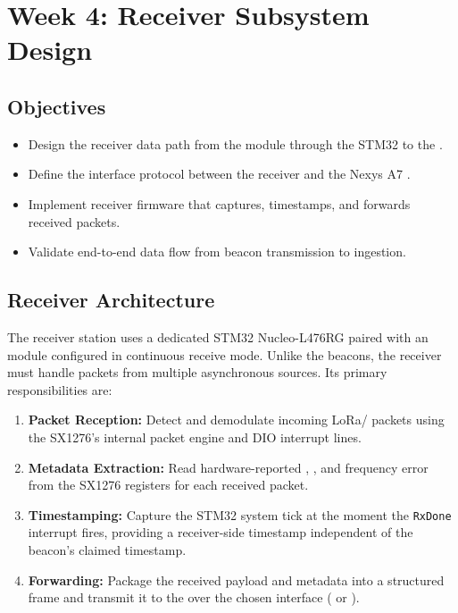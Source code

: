\documentclass[11pt,letterpaper]{article}
\begin{document}
	\newpage
	\section{Week 4: Receiver Subsystem Design}
	\label{sec:receiver}
	
	\subsection{Objectives}
	
	\begin{itemize}[leftmargin=2em]
		\item Design the receiver data path from the \RF{} module through the STM32 to the \FPGA{}.
		\item Define the interface protocol between the receiver \MCU{} and the Nexys A7 \FPGA{}.
		\item Implement receiver firmware that captures, timestamps, and forwards received packets.
		\item Validate end-to-end data flow from beacon transmission to \FPGA{} ingestion.
	\end{itemize}
	
	\subsection{Receiver Architecture}
	
	The receiver station uses a dedicated STM32 Nucleo-L476RG paired with an \RF{} module configured in continuous receive mode. Unlike the beacons, the receiver must handle packets from multiple asynchronous sources. Its primary responsibilities are:
	
	\begin{enumerate}[leftmargin=2em]
		\item \textbf{Packet Reception:} Detect and demodulate incoming LoRa/\FSK{} packets using the SX1276's internal packet engine and DIO interrupt lines.
		\item \textbf{Metadata Extraction:} Read hardware-reported \RSSI{}, \SNR{}, and frequency error from the SX1276 registers for each received packet.
		\item \textbf{Timestamping:} Capture the STM32 system tick at the moment the \texttt{RxDone} interrupt fires, providing a receiver-side timestamp independent of the beacon's claimed timestamp.
		\item \textbf{Forwarding:} Package the received payload and metadata into a structured frame and transmit it to the \FPGA{} over the chosen interface (\SPI{} or \UART{}).
	\end{enumerate}
	
\end{document}

